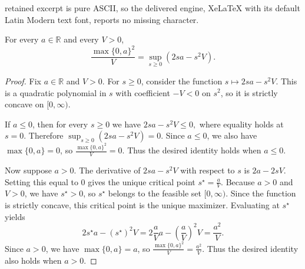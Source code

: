 \documentclass[10pt,a4paper]{amsart}
\begin{document}
retained excerpt is pure ASCII, so the delivered engine, XeLaTeX with its default Latin Modern text font, reports no missing character.
\begin{lemma}
\label{lem:scalar_positive_part_identity}
For every $a\in\mathbb R$ and every $V>0$,
\[
\frac{\max\{0,a\}^2}{V}
=
\sup_{s\ge 0}\left(2sa-s^2V\right).
\]
\end{lemma}

\begin{proof}
Fix $a\in\mathbb R$ and $V>0$. For $s\ge 0$, consider the function
$
s\longmapsto 2sa-s^2V.%
$
This is a quadratic polynomial in $s$ with coefficient $-V<0$ on $s^2$, so it
is strictly concave on $[0,\infty)$.

If $a\le 0$, then for every $s\ge 0$ we have
$
2sa-s^2V \le 0,
$
where  equality holds at $s=0$. Therefore
$
\sup_{s\ge 0}(2sa-s^2V)=0.
$
Since $a\le 0$, we also have $\max\{0,a\}=0$, so
$
\frac{\max\{0,a\}^2}{V}=0.
$
Thus the desired identity holds when $a\le 0$.

Now suppose $a>0$. The derivative of $2sa-s^2V$ with respect to $s$ is
$
2a-2sV.
$
Setting this equal to $0$ gives the unique critical point
$
s^\star=\frac{a}{V}.
$
Because $a>0$ and $V>0$, we have $s^\star>0$, so $s^\star$ belongs to the
feasible set $[0,\infty)$. Since the function is strictly concave, this critical
point is the unique maximizer. Evaluating at $s^\star$ yields
\[
2s^\star a-(s^\star)^2V
=
2\frac{a}{V}a-\left(\frac{a}{V}\right)^2V
=
\frac{a^2}{V}.
\]
Since $a>0$, we have $\max\{0,a\}=a$, so
$
\frac{\max\{0,a\}^2}{V}=\frac{a^2}{V}.
$
Thus the desired identity also holds when $a>0$.
\end{proof}
\end{document}
